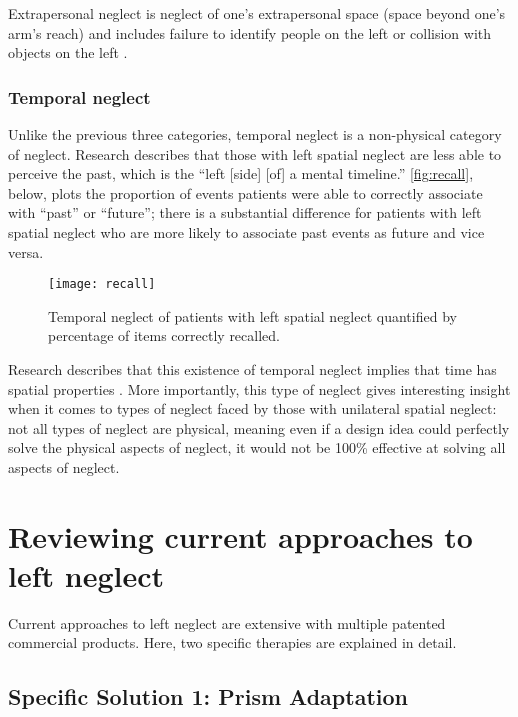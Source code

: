 Extrapersonal neglect is neglect of one’s extrapersonal space (space beyond
one’s arm’s reach) and includes failure to identify people on the left or
collision with objects on the left \cite{ting_visual_2011}.

\subsubsection{Temporal neglect}

Unlike the previous three categories, temporal neglect is a non-physical
category of neglect. Research \cite{saj_patients_2014} describes that those
with left spatial neglect are less able to perceive the past, which is the
``left [side] [of] a mental timeline.'' \autoref{fig:recall}, below, plots the
proportion of events patients were able to correctly associate with ``past'' or
``future''; there is a substantial difference for patients with left spatial
neglect who are more likely to associate past events as future and vice versa.

\begin{figure}[h]
  \centering
  \texttt{[image: recall]}
  \caption[Temporal neglect and left neglect]{Temporal neglect of patients with
    left spatial neglect quantified by percentage of items correctly recalled.}
  \label{fig:recall}
\end{figure}

Research describes that this existence of temporal neglect implies that time
has spatial properties \cite{saj_patients_2014}. More importantly, this type of
neglect gives interesting insight when it comes to types of neglect faced by
those with unilateral spatial neglect: not all types of neglect are physical,
meaning even if a design idea could perfectly solve the physical aspects of
neglect, it would not be 100\% effective at solving all aspects of neglect.

\section{Reviewing current approaches to left neglect}

Current approaches to left neglect are extensive with multiple patented
commercial products. Here, two specific therapies are explained in detail.

\subsection{Specific Solution 1: Prism Adaptation}

